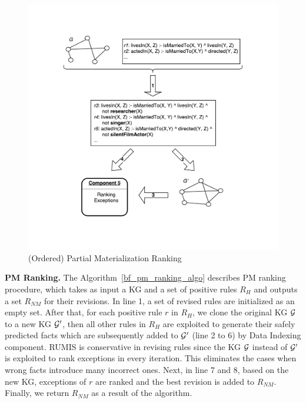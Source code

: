 \begin{figure}[ht]
\centering
\includegraphics[width=1.0\textwidth]{figures/ranking}
\caption{(Ordered) Partial Materialization Ranking}
\label{pm_ranking}
\end{figure}

\textbf{PM Ranking.} The Algorithm~\ref{bf_pm_ranking_algo} describes PM ranking procedure, which takes as input a KG and a set of positive rules $R_H$ and outputs a set $R_{NM}$ for their revisions. In line 1, a set of revised rules are initialized as an empty set. After that, for each positive rule $r$ in $R_H$, we clone the original KG $\mathcal{G}$ to a new KG $\mathcal{G}'$, then all other rules in $R_H$ are exploited to generate their safely predicted facts which are subsequently added to $\mathcal{G}'$ (line 2 to 6) by Data Indexing component. RUMIS is conservative in revising rules since the KG $\mathcal{G}$ instead of $\mathcal{G}'$ is exploited to rank exceptions in every iteration. This eliminates the cases when wrong facts introduce many incorrect ones. Next, in line 7 and 8, based on the new KG, exceptions of $r$ are ranked and the best revision is added to $R_{NM}$. Finally, we return $R_{NM}$ as a result of the algorithm.

